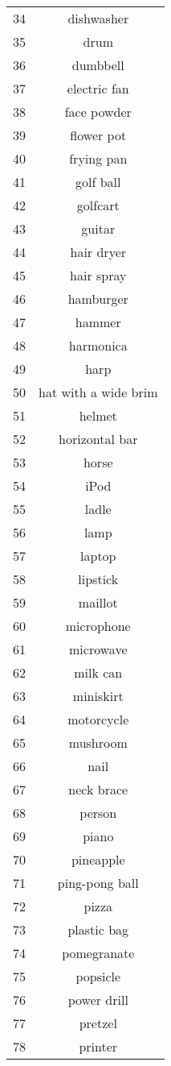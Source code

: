 \begin{multicols*}{4}
\begin{supertabular}{c|c}
34  & dishwasher \\
35  & drum \\
36  & dumbbell \\
37  & electric fan \\
38  & face powder \\
39  & flower pot \\
40  & frying pan \\
41  & golf ball \\
42  & golfcart \\
43  & guitar \\
44  & hair dryer \\
45  & hair spray \\
46  & hamburger \\
47  & hammer \\
48  & harmonica \\
49  & harp \\
50  & hat with a wide brim \\
51  & helmet \\
52  & horizontal bar \\
53  & horse \\
54  & iPod \\
55  & ladle \\
56  & lamp \\
57  & laptop \\
58  & lipstick \\
59  & maillot \\
60  & microphone \\
61  & microwave \\
62  & milk can \\
63  & miniskirt \\
64  & motorcycle \\
65  & mushroom \\
66  & nail \\
67  & neck brace \\
68  & person \\
69  & piano \\
70  & pineapple \\
71  & ping-pong ball \\
72  & pizza \\
73  & plastic bag \\
74  & pomegranate \\
75  & popsicle \\
76  & power drill \\
77  & pretzel \\
78  & printer \\

\end{supertabular}
\end{multicols*}
